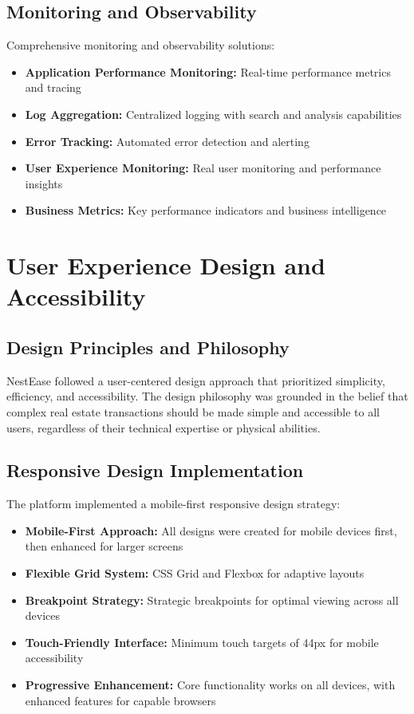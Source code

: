 \documentclass[conference]{IEEEtran}
\begin{document}
\subsection{Monitoring and Observability}
Comprehensive monitoring and observability solutions:

\begin{itemize}
    \item \textbf{Application Performance Monitoring:} Real-time performance metrics and tracing
    \item \textbf{Log Aggregation:} Centralized logging with search and analysis capabilities
    \item \textbf{Error Tracking:} Automated error detection and alerting
    \item \textbf{User Experience Monitoring:} Real user monitoring and performance insights
    \item \textbf{Business Metrics:} Key performance indicators and business intelligence
\end{itemize}

\section{User Experience Design and Accessibility}
\subsection{Design Principles and Philosophy}
NestEase followed a user-centered design approach that prioritized simplicity, efficiency, and accessibility. The design philosophy was grounded in the belief that complex real estate transactions should be made simple and accessible to all users, regardless of their technical expertise or physical abilities.

\subsection{Responsive Design Implementation}
The platform implemented a mobile-first responsive design strategy:

\begin{itemize}
    \item \textbf{Mobile-First Approach:} All designs were created for mobile devices first, then enhanced for larger screens
    \item \textbf{Flexible Grid System:} CSS Grid and Flexbox for adaptive layouts
    \item \textbf{Breakpoint Strategy:} Strategic breakpoints for optimal viewing across all devices
    \item \textbf{Touch-Friendly Interface:} Minimum touch targets of 44px for mobile accessibility
    \item \textbf{Progressive Enhancement:} Core functionality works on all devices, with enhanced features for capable browsers
\end{itemize}
\end{document}
